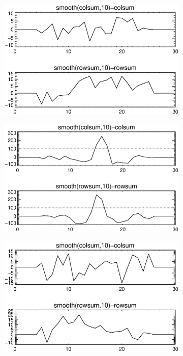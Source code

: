 \documentclass[10pt]{scrartcl}
\begin{document}
\begin{figure}[!ht]
    \begin{subfigure}[b]{.3\linewidth}
        \centering
        \includegraphics[width=1.0\linewidth]{../plots_tables_images/1d1dsums_6_0.eps}
    \end{subfigure}
    \begin{subfigure}[b]{.3\linewidth}
        \centering
        \includegraphics[width=1.0\linewidth]{../plots_tables_images/1d1dsums_6_3.eps}
    \end{subfigure}
    \begin{subfigure}[b]{.3\linewidth}
        \centering
        \includegraphics[width=1.0\linewidth]{../plots_tables_images/1d1dsums_6_9.eps}

\end{subfigure}
\end{figure}
\end{document}
